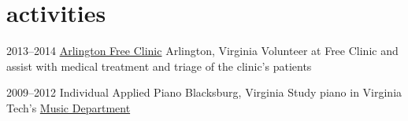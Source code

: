 \documentclass[]{friggeri-cv} %
\begin{document}

\section{activities}

\begin{entrylist}

\entry
{2013--2014}
{\href{http://www.arlingtonfreeclinic.org}{Arlington Free Clinic}}
{Arlington, Virginia}
{Volunteer at Free Clinic and assist with medical treatment and triage of the clinic's patients}

\entry
{2009--2012}
{Individual Applied Piano}
{Blacksburg, Virginia}
{Study piano in Virginia Tech's \href{http://www.music.vt.edu/}{Music Department}}
\end{entrylist}
\end{document}
